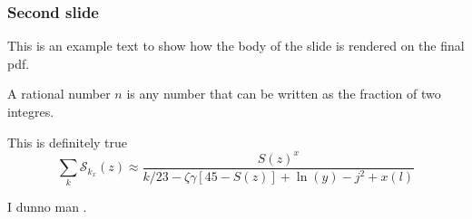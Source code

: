 \documentclass[./main.tex]{subfiles}
\begin{document}
\begin{frame}[label=slide02]
        \frametitle{Second slide}

        \footnotesize
        This is an example text to show how the body of the slide is rendered on the final pdf.
        \begin{definition}
                A rational number $n$ is any number that can be written as the fraction of two integres.
        \end{definition} \pause
        \begin{theorem}
                This is definitely true \footnotemark[1]
        \begin{equation*}
                \sum_k\mathcal{S}_{k_x}(z) \approx \frac{S(z)^x}{k / 23 -\zeta\gamma [45- S(z)] + \ln(y) - j^2+x(l)}
        \end{equation*}
        \end{theorem} \pause
        \begin{example}
                I dunno man \footnotemark[2].
        \end{example}

\end{frame}
\end{document}
